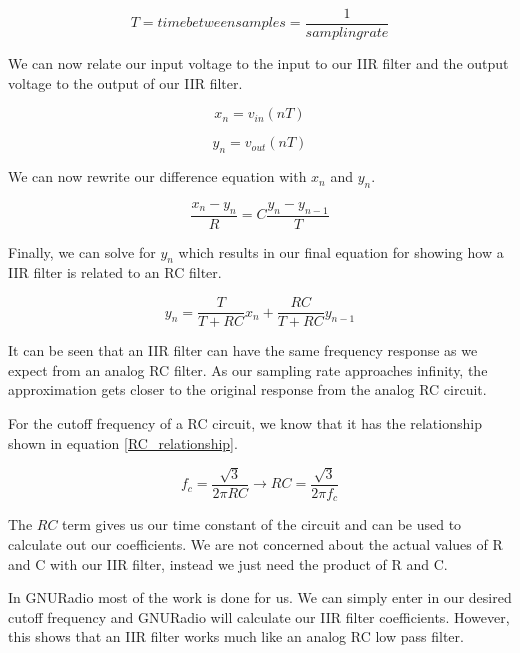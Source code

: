 \begin{equation}\label{sampling_rate_eq}
T=time between samples=\frac{1}{sampling rate}
\end{equation}

We can now relate our input voltage to the input to our IIR filter and the output voltage to the output of our IIR filter.

\begin{equation}\label{input_IIR}
x_n=v_{in}(nT)
\end{equation}

\begin{equation}\label{output_IIR}
y_n=v_{out}(nT)
\end{equation}

We can now rewrite our difference equation with $x_n$ and $y_n$.

\begin{equation}\label{diff_xn_yn}
\frac{x_n-y_n}{R}=C\frac{y_n-y_{n-1}}{T}
\end{equation}

Finally, we can solve for $y_n$ which results in our final equation for showing how a IIR filter is related to an RC filter.

\begin{equation}\label{final_IIR_RC}
y_n=\frac{T}{T+RC}x_n+\frac{RC}{T+RC}y_{n-1}
\end{equation}

It can be seen that an IIR filter can have the same frequency response as we expect from an analog RC filter.  As our sampling rate approaches infinity, the approximation gets closer to the original response from the analog RC circuit.  

For the cutoff frequency of a RC circuit, we know that it has the relationship shown in equation \ref{RC_relationship}.

\begin{equation}\label{RC_relationship}
f_c=\frac{\sqrt{3}}{2\pi RC}\rightarrow RC=\frac{\sqrt{3}}{2\pi f_c}
\end{equation}

The $RC$ term gives us our time constant of the circuit and can be used to calculate out our coefficients.  We are not concerned about the actual values of R and C with our IIR filter, instead we just need the product of R and C.  

In GNURadio most of the work is done for us.  We can simply enter in our desired cutoff frequency and GNURadio will calculate our IIR filter coefficients.  However, this shows that an IIR filter works much like an analog RC low pass filter.

